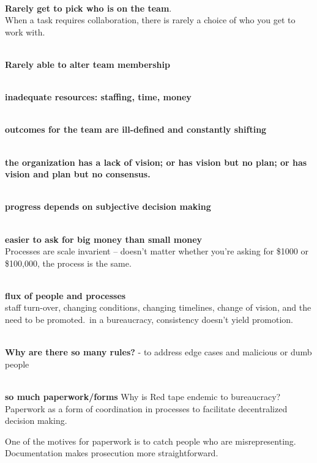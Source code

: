 \ \\

\textbf{Rarely get to pick who is on the team}. \\
When a task requires collaboration, there is rarely a choice of who you get to work with. 

\ \\

\textbf{Rarely able to alter team membership}

\ \\

\textbf{inadequate resources: staffing, time, money}

\ \\

\textbf{outcomes for the team are ill-defined and constantly shifting}

\ \\

\textbf{the organization has a lack of vision; or has vision but no plan; or has vision and plan but no consensus.}

\ \\

\textbf{progress depends on subjective decision making}

\ \\

\textbf{easier to ask for big money than small money}\\
Processes are scale invarient -- doesn't matter whether you're asking for \$1000 or \$100,000, the process is the same. 

\ \\

\textbf{flux of people and processes} \\
staff turn-over, changing conditions, changing timelines, change of vision, and the need to be promoted. in a bureaucracy, consistency doesn't yield promotion.

\ \\

\textbf{Why are there so many rules?}
- to address edge cases and malicious or dumb people

\ \\

\textbf{so much paperwork/forms}
Why is Red tape endemic to bureaucracy?\\
Paperwork as a form of coordination in processes to facilitate decentralized decision making. 

One of the motives for paperwork is to catch people who are misrepresenting. Documentation makes prosecution more straightforward.


